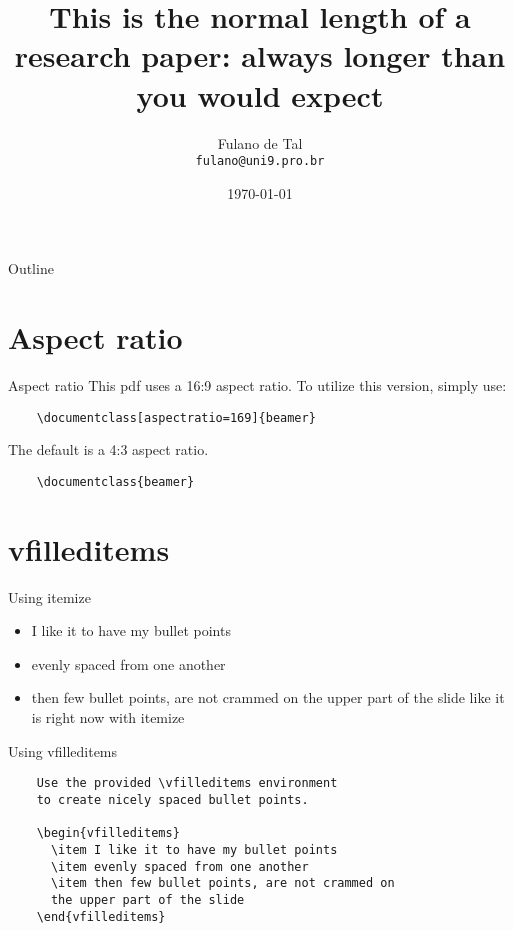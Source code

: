 \documentclass[aspectratio=169]{beamer}                    %
\title[short title]{This is the normal length of a research paper:
always longer than you would expect}
\author{Fulano de Tal \\
\texttt{fulano@uni9.pro.br}}
\institute{Universidade Nove de Julho - UNINOVE}
\date{\today}
\begin{document}
\maketitle

\begin{frame}{Outline}
    \tableofcontents
\end{frame}

\section{Aspect ratio}
\begin{frame}[fragile]{Aspect ratio}
    This pdf uses a 16:9 aspect ratio. To utilize
    this version, simply use:
    \begin{verbatim}
    \documentclass[aspectratio=169]{beamer}
    \end{verbatim}
    \vfill
    The default is a 4:3 aspect ratio.
    \begin{verbatim}
    \documentclass{beamer}
  \end{verbatim}
\end{frame}

\section{vfilleditems}
\begin{frame}{Using itemize}
    \begin{itemize}
        \item I like it to have my bullet points
        \item evenly spaced from one another
        \item then few bullet points, are not crammed on
              the upper part of the slide
              like it is right now with itemize
    \end{itemize}
\end{frame}

\begin{frame}[fragile]{Using vfilleditems}
    \begin{verbatim}
    Use the provided \vfilleditems environment
    to create nicely spaced bullet points.

    \begin{vfilleditems}
      \item I like it to have my bullet points
      \item evenly spaced from one another
      \item then few bullet points, are not crammed on
      the upper part of the slide
    \end{vfilleditems}
    \end{verbatim}
\end{frame}
\end{document}
